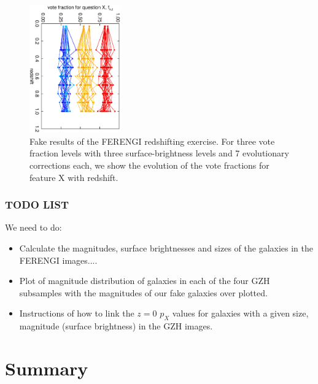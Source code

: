 \documentclass[usenatbib]{mn2e}
\begin{document}
\begin{figure}
\begin{center}

\includegraphics[width=0.35\textwidth,angle=90]{fake_results.ps}

\caption{Fake results of the FERENGI redshifting exercise. For three vote fraction levels with three surface-brightness levels and 7 evolutionary corrections each, we show the evolution of the vote fractions for feature X with redshift.}

\label{fig:ferengi_results_fake}

\end{center}
\end{figure}

\subsubsection{TODO LIST}
We need to do: 
\begin{itemize}
\item Calculate the magnitudes, surface brightnesses and sizes of the galaxies in the FERENGI images....
\item Plot of magnitude distribution of galaxies in each of the four GZH subsamples with the magnitudes of our fake galaxies over plotted. 
\item Instructions of how to link the $z=0$ $p_X$ values for galaxies with a given size, magnitude (surface brightness) in the GZH images. 
\end{itemize}



\section{Summary}
\end{document}
